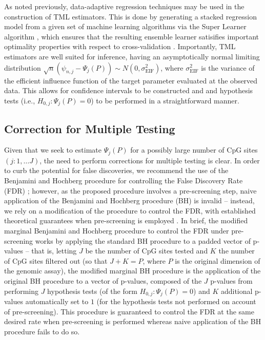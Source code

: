 \documentclass[9pt,a4paper,]{extarticle}
\theoremstyle{definition}
\theoremstyle{definition}
\theoremstyle{definition}
\theoremstyle{remark}
\begin{document}
As noted previously, data-adaptive regression techniques may be used in the
construction of TML estimators. This is done by generating a stacked regression
model from a given set of machine learning algorithms via the Super Learner
algorithm \citep[breiman1996stacked, vdl2007super]{wolpert1992stacked}, which ensures
that the resulting ensemble learner satisifies important optimality properties
with respect to cross-validation \citep[\citet{dudoit2005asymptotics},
\citet{vdl2003unified}]{vdl2004asymptotic}. Importantly, TML estimators are well suited for inference,
having an asymptotically normal limiting distribution
\citep[\citet{vdl2006targeted}]{tsiatis2007semiparametric} \(\sqrt{n}(\psi_{n, j} - \Psi_j(P)) \sim N(0, \sigma_{\text{EIF}}^2)\), where \(\sigma_{\text{EIF}}^2\) is
the variance of the efficient influence function of the target parameter
evaluated at the observed data. This allows for confidence intervals to be
constructed and and hypothesis tests (i.e., \(H_{0, j}: \Psi_j(P) = 0\)) to be
performed in a straightforward manner.

\hypertarget{correction-for-multiple-testing}{%
\subsection{Correction for Multiple Testing}\label{correction-for-multiple-testing}}

Given that we seek to estimate \(\Psi_j(P)\) for a possibly large number of CpG
sites \((j: 1, \ldots J)\), the need to perform corrections for multiple testing
is clear. In order to curb the potential for false discoveries, we recommend the
use of the Benjamini and Hochberg procedure for controlling the False Discovery
Rate (FDR) \citep{benjamini1995controlling}; however, as the proposed procedure
involves a pre-screening step, naive application of the Benjamini and Hochberg
procedure (BH) is invalid -- instead, we rely on a modification of the procedure
to control the FDR, with established theoretical guarantees when pre-screening
is employed \citep{tuglus2009modified}. In brief, the modified marginal Benjamini and
Hochberg procedure to control the FDR under pre-screening works by applying the
standard BH procedure to a padded vector of p-values -- that is, letting \(J\) be
the number of CpG sites tested and \(K\) the number of CpG sites filtered out (so
that \(J + K = P\), where \(P\) is the original dimension of the genomic assay), the
modified marginal BH procedure is the application of the original BH procedure
to a vector of p-values, composed of the \(J\) p-values from performing \(J\)
hypothesis tests (of the form \(H_{0, j}: \Psi_j(P) = 0\)) and \(K\) additional
p-values automatically set to \(1\) (for the hypothesis tests not performed on
account of pre-screening). This procedure is guaranteed to control the FDR at
the same desired rate when pre-screening is performed whereas naive application
of the BH procedure fails to do so.
\end{document}
